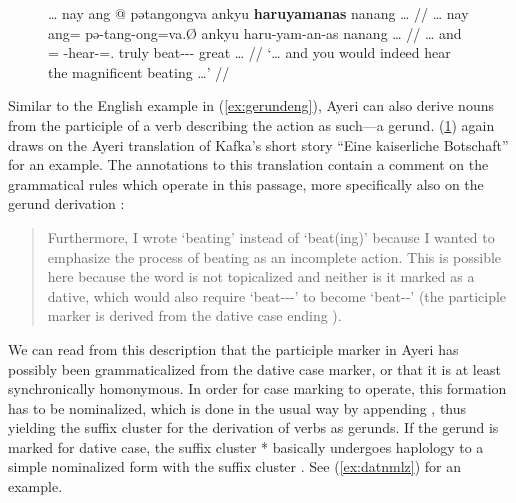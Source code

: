 \begin{figure}[h]
\ex\label{ex:kafkagerund}\begingl
	\gla … nay ang @ pətangongva ankyu \textbf{haruyamanas} nanang … //
	\glb … nay ang= pə-tang-ong=va.Ø ankyu haru-yam-an-as nanang … //
	\glc … and \AgtT{}= \NFut{}-hear-\Irr{}=\Second{}.\Top{} truly 
		beat-\Ptcp{}-\Nmlz{}-\Parg{} great … // %
	\glft `… and you would indeed hear the magnificent beating …' //
\endgl\xe
\end{figure}

Similar to the English example in (\ref{ex:gerundeng}), Ayeri can also derive
nouns from the participle of a verb describing the action as such---a gerund.
(\ref{ex:kafkagerund}) again draws on the Ayeri translation of Kafka's short
story \enquote{Eine kaiserliche Botschaft} \citep[2, 14]{becker:kafka:imperial}
for an example. The annotations to this translation contain a comment on the
grammatical rules which operate in this passage, more specifically also on the
gerund derivation :

\blockcquote[14--15]{becker:kafka:imperial}{Furthermore, I wrote
 `beating' instead of  `beat(ing)' because I wanted to
emphasize the process of beating as an incomplete action. This is possible here
because the word is not topicalized and neither is it marked as a dative, which
would also require  `beat-\Ptcp{}-\Nmlz{}-\Dat{}' to become
 `beat-\Nmlz{}-\Dat{}' (the participle marker  is 
derived from the dative case ending ).}

We can read from this description that the participle marker in Ayeri has
possibly been grammaticalized from the dative case marker, or that it is at
least synchronically homonymous. In order for case marking to operate, this
formation has to be nominalized, which is done in the usual way by appending
, thus yielding the suffix cluster  for the
derivation of verbs as gerunds. If the gerund is marked for dative case, the
suffix cluster * basically undergoes haplology to a
simple nominalized form with the suffix cluster . See
(\ref{ex:datnmlz}) for an example.

